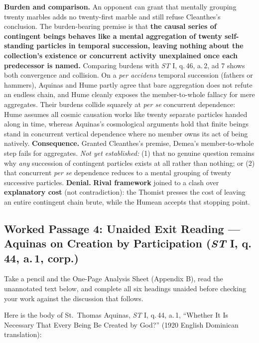 \textbf{Burden and comparison.} An opponent can grant that mentally grouping twenty marbles adds no twenty-first marble and still refuse Cleanthes's conclusion. The burden-bearing premise is that \textbf{the causal series of contingent beings behaves like a mental aggregation of twenty self-standing particles in temporal succession, leaving nothing about the collection's existence or concurrent activity unexplained once each predecessor is named.} Comparing burdens with \emph{ST} I, q.\,46, a.\,2, ad 7 shows both convergence and collision. On a \emph{per accidens} temporal succession (fathers or hammers), Aquinas and Hume partly agree that bare aggregation does not refute an endless chain, and Hume cleanly exposes the member-to-whole fallacy for mere aggregates. Their burdens collide squarely at \emph{per se} concurrent dependence: Hume assumes all cosmic causation works like twenty separate particles handed along in time, whereas Aquinas's cosmological arguments hold that finite beings stand in concurrent vertical dependence where no member owns its act of being natively. \textbf{Consequence.} Granted Cleanthes's premise, Demea's member-to-whole step fails for aggregates. \emph{Not yet established:} (1) that no genuine question remains why \emph{any} succession of contingent particles exists at all rather than nothing; or (2) that concurrent \emph{per se} dependence reduces to a mental grouping of twenty successive particles. \textbf{Denial.} \textbf{Rival framework} joined to a clash over \textbf{explanatory cost} (not contradiction): the Thomist presses the cost of leaving an entire contingent chain brute, while the Humean accepts that stopping point.

\subsection{Worked Passage 4: Unaided Exit Reading --- Aquinas on Creation by Participation (\emph{ST} I, q.\,44, a.\,1, corp.)}

Take a pencil and the One-Page Analysis Sheet (Appendix B), read the unannotated text below, and complete all six headings unaided before checking your work against the discussion that follows.

Here is the body of St.\ Thomas Aquinas, \emph{ST} I, q.\,44, a.\,1, ``Whether It Is Necessary That Every Being Be Created by God?'' (1920 English Dominican translation):

